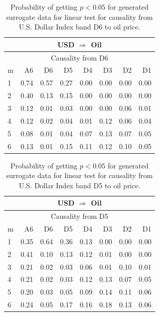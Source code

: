 %
%
\begin{table}[H]
\begin{center}
\begin{tabular}{l|r r r r r r r}
\hline\hline
\multicolumn{8}{c}{USD $\Rightarrow$ Oil}\\
\hline
\multicolumn{8}{c}{Causality from D6}\\
\hline\hline
m & A6 & D6 & D5 & D4 & D3 & D2 & D1 \\
\hline
1 & 0.74 & 0.57 & 0.27 & 0.00 & 0.00 & 0.00 & 0.00 \\
2 & 0.40 & 0.13 & 0.15 & 0.00 & 0.00 & 0.00 & 0.00 \\
3 & 0.12 & 0.01 & 0.03 & 0.00 & 0.00 & 0.06 & 0.01 \\
4 & 0.12 & 0.02 & 0.04 & 0.01 & 0.12 & 0.06 & 0.04 \\
5 & 0.08 & 0.01 & 0.04 & 0.07 & 0.13 & 0.07 & 0.05 \\
6 & 0.13 & 0.01 & 0.15 & 0.11 & 0.12 & 0.10 & 0.05 \\
\hline\hline
\end{tabular}
\caption{Probability of getting $p < 0.05$ for generated surrogate data for linear test for causality from U.S. Dollar Index band D6 to oil price.}
\end{center}
\end{table}

%
%
\begin{table}[H]
\begin{center}
\begin{tabular}{l|r r r r r r r}
\hline\hline
\multicolumn{8}{c}{USD $\Rightarrow$ Oil}\\
\hline
\multicolumn{8}{c}{Causality from D5}\\
\hline\hline
m & A6 & D6 & D5 & D4 & D3 & D2 & D1 \\
\hline
1 & 0.35 & 0.64 & 0.36 & 0.13 & 0.00 & 0.00 & 0.00 \\
2 & 0.41 & 0.10 & 0.13 & 0.12 & 0.01 & 0.00 & 0.00 \\
3 & 0.21 & 0.02 & 0.03 & 0.06 & 0.01 & 0.10 & 0.01 \\
4 & 0.21 & 0.02 & 0.03 & 0.12 & 0.13 & 0.07 & 0.05 \\
5 & 0.20 & 0.03 & 0.05 & 0.09 & 0.14 & 0.11 & 0.06 \\
6 & 0.24 & 0.05 & 0.17 & 0.16 & 0.18 & 0.13 & 0.06 \\
\hline\hline
\end{tabular}
\caption{Probability of getting $p < 0.05$ for generated surrogate data for linear test for causality from U.S. Dollar Index band D5 to oil price.}
\end{center}
\end{table}

